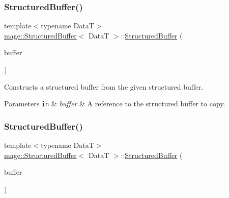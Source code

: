 \subsubsection{\texorpdfstring{Structured\+Buffer()}{StructuredBuffer()}\hspace{0.1cm}{\footnotesize\ttfamily [3/4]}}
{\footnotesize\ttfamily template$<$typename DataT$>$ \\
\hyperlink{structmage_1_1_structured_buffer}{mage\+::\+Structured\+Buffer}$<$ DataT $>$\+::\hyperlink{structmage_1_1_structured_buffer}{Structured\+Buffer} (\begin{DoxyParamCaption}\item[{const \hyperlink{structmage_1_1_structured_buffer}{Structured\+Buffer}$<$ DataT $>$ \&}]{buffer }\end{DoxyParamCaption})\hspace{0.3cm}{\ttfamily [delete]}}

Constructs a structured buffer from the given structured buffer.


\begin{DoxyParams}[1]{Parameters}
\mbox{\tt in}  & {\em buffer} & A reference to the structured buffer to copy. \\
\hline
\end{DoxyParams}
\hypertarget{structmage_1_1_structured_buffer_a455bd930f39f5fdf6af4f453694997da}{}\label{structmage_1_1_structured_buffer_a455bd930f39f5fdf6af4f453694997da} 
\subsubsection{\texorpdfstring{Structured\+Buffer()}{StructuredBuffer()}\hspace{0.1cm}{\footnotesize\ttfamily [4/4]}}
{\footnotesize\ttfamily template$<$typename DataT$>$ \\
\hyperlink{structmage_1_1_structured_buffer}{mage\+::\+Structured\+Buffer}$<$ DataT $>$\+::\hyperlink{structmage_1_1_structured_buffer}{Structured\+Buffer} (\begin{DoxyParamCaption}\item[{\hyperlink{structmage_1_1_structured_buffer}{Structured\+Buffer}$<$ DataT $>$ \&\&}]{buffer }\end{DoxyParamCaption})\hspace{0.3cm}{\ttfamily [default]}}


